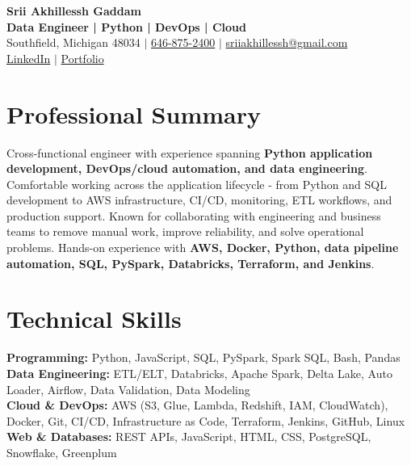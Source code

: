 \documentclass[letterpaper,10pt]{article}
\begin{document}
\fontsize{9.35pt}{10.45pt}\selectfont

\begin{center}
    {\LARGE \textbf{Srii Akhillessh Gaddam}} \\[-1pt]
    \textbf{Data Engineer | Python | DevOps | Cloud} \\[2pt]
    Southfield, Michigan 48034 $|$
    \href{tel:6468752400}{646-875-2400} $|$
    \href{mailto:sriiakhillessh@gmail.com}{sriiakhillessh@gmail.com} \\[1pt]
    \href{https://www.linkedin.com/in/srii-akhiilessh-gaddam-b48668191/}{LinkedIn} $|$
    \href{https://sriiakhillesshg.github.io/portfolio/}{Portfolio}
\end{center}
\vspace{-8pt}

\section{Professional Summary}
\small{Cross-functional engineer with experience spanning \textbf{Python application development, DevOps/cloud automation, and data engineering}. Comfortable working across the application lifecycle - from Python and SQL development to AWS infrastructure, CI/CD, monitoring, ETL workflows, and production support. Known for collaborating with engineering and business teams to remove manual work, improve reliability, and solve operational problems. Hands-on experience with \textbf{AWS, Docker, Python, data pipeline automation, SQL, PySpark, Databricks, Terraform, and Jenkins}.}

\section{Technical Skills}
\small{
\textbf{Programming:} Python, JavaScript, SQL, PySpark, Spark SQL, Bash, Pandas \\
\textbf{Data Engineering:} ETL/ELT, Databricks, Apache Spark, Delta Lake, Auto Loader, Airflow, Data Validation, Data Modeling \\
\textbf{Cloud \& DevOps:} AWS (S3, Glue, Lambda, Redshift, IAM, CloudWatch), Docker, Git, CI/CD, Infrastructure as Code, Terraform, Jenkins, GitHub, Linux \\
\textbf{Web \& Databases:} REST APIs, JavaScript, HTML, CSS, PostgreSQL, Snowflake, Greenplum
}
\end{document}
